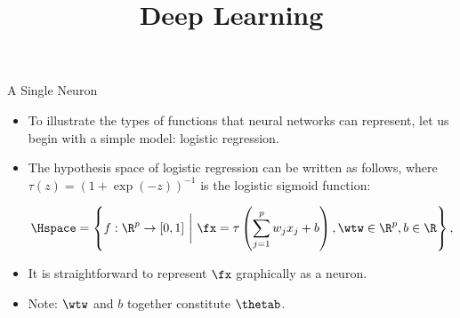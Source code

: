 




\newcommand{\titlefigure}{figure/step2-zin.jpg}
\newcommand{\learninggoals}{
  \item Graphical representation of a single neuron
  \item Affine transformations and non-linear activation functions
  \item Hypothesis spaces of single neuron architectures
  \item Typical loss functions
}

\title{Deep Learning}
\date{}




\begin{frame} {A Single Neuron}
\begin{itemize}
\item To illustrate the types of functions that neural networks can represent, let us begin with a simple model: logistic regression.
\vspace{5mm}
\item The hypothesis space of logistic regression can be written as follows, where $\tau(z) = (1 + \exp(-z))^{-1}$ is the logistic sigmoid function:
\begin{small} 
$$\Hspace = \left\{f: \R^p \to [0, 1] ~\bigg|~ \fx = \tau\left(\sum_{j = 1}^p w_j x_j + b\right), \wtw \in \R^p, b \in \R \right\},$$ \end{small}
\vspace{3mm}
\item It is straightforward to represent $\fx$ graphically as a neuron.
\vspace{5mm}
\item Note: $\wtw$ and $b$ together constitute $\thetab$.
\end{itemize}
\end{frame}

